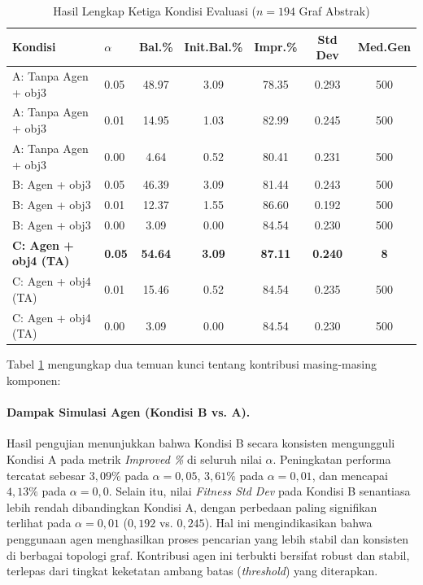 \begin{table}[htbp]
\centering
\caption{Hasil Lengkap Ketiga Kondisi Evaluasi ($n=194$ Graf Abstrak)}
\label{tab:abc_full}
\begin{tabular}{llccccc}
\hline
\textbf{Kondisi} & $\alpha$ & \textbf{Bal.\%} & \textbf{Init.Bal.\%} & \textbf{Impr.\%} & \textbf{Std Dev} & \textbf{Med.Gen} \\
\hline
A: Tanpa Agen + obj3 & 0.05 & 48.97 & 3.09 & 78.35 & 0.293 & 500 \\
A: Tanpa Agen + obj3 & 0.01 & 14.95 & 1.03 & 82.99 & 0.245 & 500 \\
A: Tanpa Agen + obj3 & 0.00 &  4.64 & 0.52 & 80.41 & 0.231 & 500 \\
\hline
B: Agen + obj3       & 0.05 & 46.39 & 3.09 & 81.44 & 0.243 & 500 \\
B: Agen + obj3       & 0.01 & 12.37 & 1.55 & 86.60 & 0.192 & 500 \\
B: Agen + obj3       & 0.00 &  3.09 & 0.00 & 84.54 & 0.230 & 500 \\
\hline
\textbf{C: Agen + obj4 (TA)} & \textbf{0.05} & \textbf{54.64} & \textbf{3.09} & \textbf{87.11} & \textbf{0.240} & \textbf{8} \\
C: Agen + obj4 (TA)  & 0.01 & 15.46 & 0.52 & 84.54 & 0.235 & 500 \\
C: Agen + obj4 (TA)  & 0.00 &  3.09 & 0.00 & 84.54 & 0.230 & 500 \\
\hline
\end{tabular}
\end{table}

Tabel \ref{tab:abc_full} mengungkap dua temuan kunci tentang kontribusi masing-masing komponen:

\paragraph{Dampak Simulasi Agen (Kondisi B vs. A).}
Hasil pengujian menunjukkan bahwa Kondisi B secara konsisten mengungguli Kondisi A pada metrik \textit{Improved \%} di seluruh nilai $\alpha$. Peningkatan performa tercatat sebesar $3{,}09\%$ pada $\alpha=0{,}05$, $3{,}61\%$ pada $\alpha=0{,}01$, dan mencapai $4{,}13\%$ pada $\alpha=0{,}0$. Selain itu, nilai \textit{Fitness Std Dev} pada Kondisi B senantiasa lebih rendah dibandingkan Kondisi A, dengan perbedaan paling signifikan terlihat pada $\alpha=0{,}01$ ($0{,}192$ vs. $0{,}245$). Hal ini mengindikasikan bahwa penggunaan agen menghasilkan proses pencarian yang lebih stabil dan konsisten di berbagai topologi graf. Kontribusi agen ini terbukti bersifat robust dan stabil, terlepas dari tingkat keketatan ambang batas (\textit{threshold}) yang diterapkan.

